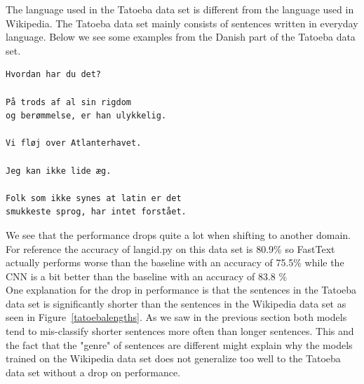 The language used in the Tatoeba data set is different from the language used in Wikipedia. The Tatoeba data set mainly consists of sentences written in everyday language. Below we see some examples from the Danish part of the Tatoeba data set.
\begin{verbatim}
Hvordan har du det?

På trods af al sin rigdom
og berømmelse, er han ulykkelig.

Vi fløj over Atlanterhavet.

Jeg kan ikke lide æg.

Folk som ikke synes at latin er det
smukkeste sprog, har intet forstået.
\end{verbatim}



We see that the performance drops quite a lot when shifting to another domain. For reference the accuracy of langid.py on this data set is 80.9\% so FastText actually performs worse than the baseline with an accuracy of 75.5\% while the CNN is a bit better than the baseline with an accuracy of 83.8 \% \\

One explanation for the drop in performance is that the sentences in the Tatoeba data set is significantly shorter than the sentences in the Wikipedia data set as seen in Figure~\ref{tatoebalengths}. As we saw in the previous section both models tend to mis-classify shorter sentences more often than longer sentences. This and the fact that the "genre" of sentences are different might explain why the models trained on the Wikipedia data set does not generalize too well to the Tatoeba data set without a drop on performance.\\

